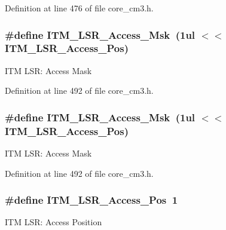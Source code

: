 Definition at line 476 of file core\+\_\+cm3.\+h.

\subsubsection[{\texorpdfstring{I\+T\+M\+\_\+\+L\+S\+R\+\_\+\+Access\+\_\+\+Msk}{ITM_LSR_Access_Msk}}]{\setlength{\rightskip}{0pt plus 5cm}\#define I\+T\+M\+\_\+\+L\+S\+R\+\_\+\+Access\+\_\+\+Msk~(1ul $<$$<$ I\+T\+M\+\_\+\+L\+S\+R\+\_\+\+Access\+\_\+\+Pos)}\hypertarget{group___c_m_s_i_s___c_m3___i_t_m_gac8ae69f11c0311da226c0c8ec40b3d37}{}\label{group___c_m_s_i_s___c_m3___i_t_m_gac8ae69f11c0311da226c0c8ec40b3d37}
I\+TM L\+SR\+: Access Mask 

Definition at line 492 of file core\+\_\+cm3.\+h.

\subsubsection[{\texorpdfstring{I\+T\+M\+\_\+\+L\+S\+R\+\_\+\+Access\+\_\+\+Msk}{ITM_LSR_Access_Msk}}]{\setlength{\rightskip}{0pt plus 5cm}\#define I\+T\+M\+\_\+\+L\+S\+R\+\_\+\+Access\+\_\+\+Msk~(1ul $<$$<$ I\+T\+M\+\_\+\+L\+S\+R\+\_\+\+Access\+\_\+\+Pos)}\hypertarget{group___c_m_s_i_s___c_m3___i_t_m_gac8ae69f11c0311da226c0c8ec40b3d37}{}\label{group___c_m_s_i_s___c_m3___i_t_m_gac8ae69f11c0311da226c0c8ec40b3d37}
I\+TM L\+SR\+: Access Mask 

Definition at line 492 of file core\+\_\+cm3.\+h.

\subsubsection[{\texorpdfstring{I\+T\+M\+\_\+\+L\+S\+R\+\_\+\+Access\+\_\+\+Pos}{ITM_LSR_Access_Pos}}]{\setlength{\rightskip}{0pt plus 5cm}\#define I\+T\+M\+\_\+\+L\+S\+R\+\_\+\+Access\+\_\+\+Pos~1}\hypertarget{group___c_m_s_i_s___c_m3___i_t_m_ga144a49e12b83ad9809fdd2769094fdc0}{}\label{group___c_m_s_i_s___c_m3___i_t_m_ga144a49e12b83ad9809fdd2769094fdc0}
I\+TM L\+SR\+: Access Position 

